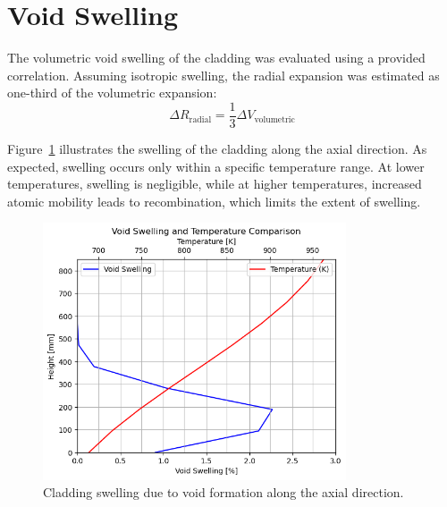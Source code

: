 \section{Void Swelling}
The volumetric void swelling of the cladding was evaluated using a provided correlation. Assuming isotropic swelling, the radial expansion was estimated as one-third of the volumetric expansion:
\[
\Delta R_{\text{radial}} = \frac{1}{3} \Delta V_{\text{volumetric}}
\]

Figure~\ref{fig:void_swelling} illustrates the swelling of the cladding along the axial direction. As expected, swelling occurs only within a specific temperature range. At lower temperatures, swelling is negligible, while at higher temperatures, increased atomic mobility leads to recombination, which limits the extent of swelling.

\begin{figure}[H]
\centering
\includegraphics[width=0.8\textwidth]{void_swell.png}
\caption{Cladding swelling due to void formation along the axial direction.}
\label{fig:void_swelling}
\end{figure}

